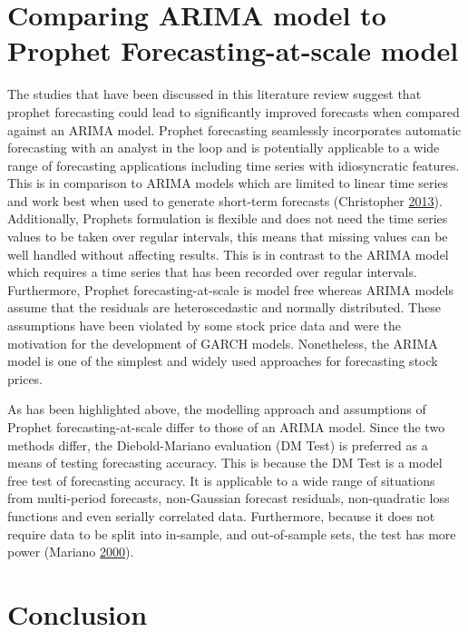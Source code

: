 \documentclass[12pt,preprint, authoryear]{elsarticle}
\numberwithin{equation}{section}
\numberwithin{figure}{section}
\numberwithin{table}{section}
\begin{document}
\section{Comparing ARIMA model to Prophet Forecasting-at-scale
model}\label{comparing-arima-model-to-prophet-forecasting-at-scale-model}

The studies that have been discussed in this literature review suggest
that prophet forecasting could lead to significantly improved forecasts
when compared against an ARIMA model. Prophet forecasting seamlessly
incorporates automatic forecasting with an analyst in the loop and is
potentially applicable to a wide range of forecasting applications
including time series with idiosyncratic features. This is in comparison
to ARIMA models which are limited to linear time series and work best
when used to generate short-term forecasts (Christopher
\protect\hyperlink{ref-Baum}{2013}). Additionally, Prophets formulation
is flexible and does not need the time series values to be taken over
regular intervals, this means that missing values can be well handled
without affecting results. This is in contrast to the ARIMA model which
requires a time series that has been recorded over regular intervals.
Furthermore, Prophet forecasting-at-scale is model free whereas ARIMA
models assume that the residuals are heteroscedastic and normally
distributed. These assumptions have been violated by some stock price
data and were the motivation for the development of GARCH models.
Nonetheless, the ARIMA model is one of the simplest and widely used
approaches for forecasting stock prices.

As has been highlighted above, the modelling approach and assumptions of
Prophet forecasting-at-scale differ to those of an ARIMA model. Since
the two methods differ, the Diebold-Mariano evaluation (DM Test) is
preferred as a means of testing forecasting accuracy. This is because
the DM Test is a model free test of forecasting accuracy. It is
applicable to a wide range of situations from multi-period forecasts,
non-Gaussian forecast residuals, non-quadratic loss functions and even
serially correlated data. Furthermore, because it does not require data
to be split into in-sample, and out-of-sample sets, the test has more
power (Mariano \protect\hyperlink{ref-Mariano2000}{2000}).

\section{Conclusion}\label{conclusion}
\end{document}
